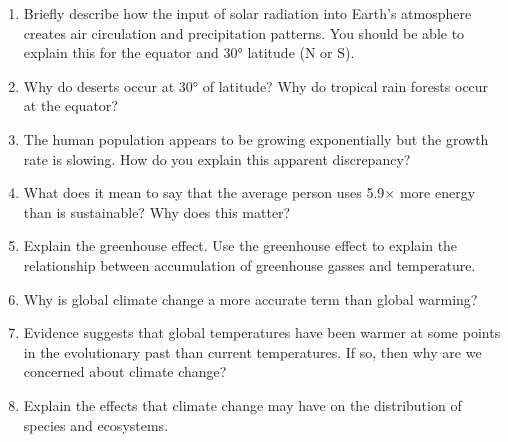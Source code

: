 \documentclass[letterpaper]{tufte-handout}
\begin{document}
\begin{enumerate}

	\item Briefly describe how the input of solar radiation into Earth's atmosphere creates air circulation and precipitation patterns. You should be able to explain this for the equator and 30° latitude (N or S).

	\item Why do deserts occur at 30° of latitude? Why do tropical rain forests occur at the equator?

	\item The human population appears to be growing exponentially but the growth rate is slowing. How do you explain this apparent discrepancy? 

	\item What does it mean to say that the average person uses 5.9$\times$ more energy than is sustainable? Why does this matter?

	\item Explain the greenhouse effect. Use the greenhouse effect to explain the relationship between accumulation of greenhouse gasses and temperature.
	
	\item Why is global climate change a more accurate term than global warming?
	
	\item Evidence suggests that global temperatures have been warmer at some points in the evolutionary past than current temperatures. If so, then why are we concerned about climate change?
	
	\item Explain the effects that climate change may have on the distribution of species and ecosystems.

\end{enumerate}
\end{document}
